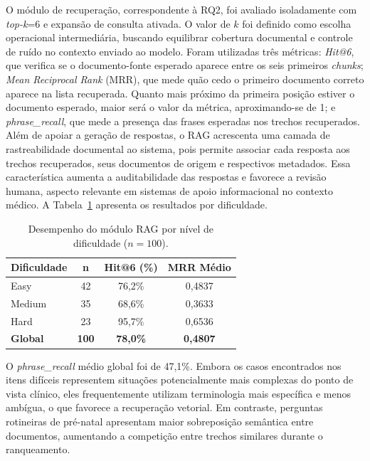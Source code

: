 O módulo de recuperação, correspondente à RQ2, foi avaliado isoladamente com \textit{top-k}=6 e expansão de consulta ativada.
O valor de $k$ foi definido como escolha operacional intermediária, buscando equilibrar cobertura documental e controle de ruído no contexto enviado ao modelo.
Foram utilizadas três métricas:
\textit{Hit@6}, que verifica se o documento-fonte esperado aparece entre os seis primeiros \textit{chunks};
\textit{Mean Reciprocal Rank} (MRR), que mede quão cedo o primeiro documento correto aparece na lista recuperada. Quanto mais próximo da primeira posição estiver o documento esperado, maior será o valor da métrica, aproximando-se de 1;
e \textit{phrase\_recall}, que mede a presença das frases esperadas nos trechos recuperados.
Além de apoiar a geração de respostas, o RAG acrescenta uma camada de rastreabilidade documental ao sistema, pois permite associar cada resposta aos trechos recuperados, seus documentos de origem e respectivos metadados.
Essa característica aumenta a auditabilidade das respostas e favorece a revisão humana, aspecto relevante em sistemas de apoio informacional no contexto médico.
A Tabela~\ref{tab:metricas_rag} apresenta os resultados por dificuldade.

\begin{table}[t!]
  \centering
  \caption{Desempenho do módulo RAG por nível de dificuldade ($n=100$).}
  \label{tab:metricas_rag}
  \begin{tabular}{lccc}
  	\toprule
  	\textbf{Dificuldade} & \textbf{n}   & \textbf{Hit@6 (\%)}  & \textbf{MRR Médio} \\
  	\midrule
  	Easy                 & 42           & 76,2\%               & 0,4837             \\
  	Medium               & 35           & 68,6\%               & 0,3633             \\
  	Hard                 & 23           & 95,7\%               & 0,6536             \\
  	\midrule
  	\textbf{Global}      & \textbf{100} & \textbf{78,0\%}      & \textbf{0,4807}    \\
  	\bottomrule
  	\end{tabular}
  \end{table}
  
O \textit{phrase\_recall} médio global foi de 47,1\%.
Embora os casos encontrados nos itens difíceis representem situações potencialmente mais complexas do ponto de vista clínico, eles frequentemente utilizam terminologia mais específica e menos ambígua, o que favorece a recuperação vetorial.
Em contraste, perguntas rotineiras de pré-natal apresentam maior sobreposição semântica entre documentos, aumentando a competição entre trechos similares durante o ranqueamento.


